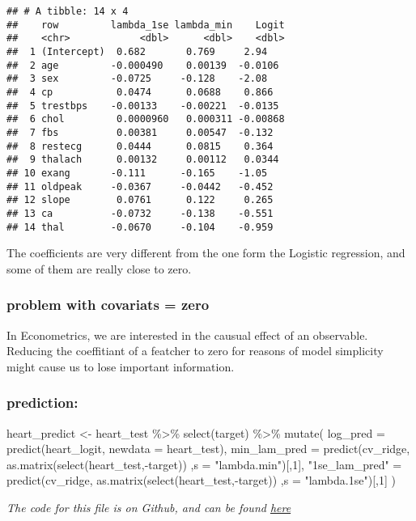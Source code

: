 \documentclass[
]{article}
\newenvironment{Shaded}{\begin{snugshade}}{\end{snugshade}}
\newcommand{\AttributeTok}[1]{\textcolor[rgb]{0.77,0.63,0.00}{#1}}
\newcommand{\DecValTok}[1]{\textcolor[rgb]{0.00,0.00,0.81}{#1}}
\newcommand{\FunctionTok}[1]{\textcolor[rgb]{0.00,0.00,0.00}{#1}}
\newcommand{\NormalTok}[1]{#1}
\newcommand{\OtherTok}[1]{\textcolor[rgb]{0.56,0.35,0.01}{#1}}
\newcommand{\SpecialCharTok}[1]{\textcolor[rgb]{0.00,0.00,0.00}{#1}}
\newcommand{\StringTok}[1]{\textcolor[rgb]{0.31,0.60,0.02}{#1}}
\begin{document}
\begin{verbatim}
## # A tibble: 14 x 4
##    row         lambda_1se lambda_min    Logit
##    <chr>            <dbl>      <dbl>    <dbl>
##  1 (Intercept)  0.682       0.769     2.94   
##  2 age         -0.000490    0.00139  -0.0106 
##  3 sex         -0.0725     -0.128    -2.08   
##  4 cp           0.0474      0.0688    0.866  
##  5 trestbps    -0.00133    -0.00221  -0.0135 
##  6 chol         0.0000960   0.000311 -0.00868
##  7 fbs          0.00381     0.00547  -0.132  
##  8 restecg      0.0444      0.0815    0.364  
##  9 thalach      0.00132     0.00112   0.0344 
## 10 exang       -0.111      -0.165    -1.05   
## 11 oldpeak     -0.0367     -0.0442   -0.452  
## 12 slope        0.0761      0.122     0.265  
## 13 ca          -0.0732     -0.138    -0.551  
## 14 thal        -0.0670     -0.104    -0.959
\end{verbatim}

The coefficients are very different from the one form the Logistic
regression, and some of them are really close to zero.

\hypertarget{problem-with-covariats-zero}{%
\subsubsection{problem with covariats =
zero}\label{problem-with-covariats-zero}}

In Econometrics, we are interested in the causual effect of an
observable. Reducing the coeffitiant of a featcher to zero for reasons
of model simplicity might cause us to lose important information.

\hypertarget{prediction}{%
\subsubsection{prediction:}\label{prediction}}

\begin{Shaded}
\begin{Highlighting}[]
\NormalTok{heart\_predict }\OtherTok{\textless{}{-}}\NormalTok{ heart\_test }\SpecialCharTok{\%\textgreater{}\%}
  \FunctionTok{select}\NormalTok{(target) }\SpecialCharTok{\%\textgreater{}\%}
  \FunctionTok{mutate}\NormalTok{(}
    \AttributeTok{log\_pred =} \FunctionTok{predict}\NormalTok{(heart\_logit, }\AttributeTok{newdata =}\NormalTok{ heart\_test),}
    \AttributeTok{min\_lam\_pred =} \FunctionTok{predict}\NormalTok{(cv\_ridge,}
                           \FunctionTok{as.matrix}\NormalTok{(}\FunctionTok{select}\NormalTok{(heart\_test,}\SpecialCharTok{{-}}\NormalTok{target))}
\NormalTok{                           ,}\AttributeTok{s =} \StringTok{"lambda.min"}\NormalTok{)[,}\DecValTok{1}\NormalTok{],}
    \StringTok{"1se\_lam\_pred"} \OtherTok{=} \FunctionTok{predict}\NormalTok{(cv\_ridge,}
                           \FunctionTok{as.matrix}\NormalTok{(}\FunctionTok{select}\NormalTok{(heart\_test,}\SpecialCharTok{{-}}\NormalTok{target))}
\NormalTok{                           ,}\AttributeTok{s =} \StringTok{"lambda.1se"}\NormalTok{)[,}\DecValTok{1}\NormalTok{]}
\NormalTok{  )}
\end{Highlighting}
\end{Shaded}

\emph{The code for this file is on Github, and can be found
\href{https://github.com/zamirD123/ML4ECON_PS_2.git}{here}}
\end{document}
